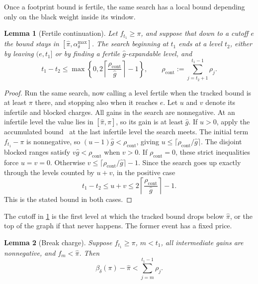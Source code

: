 \documentclass[11pt]{article}
\theoremstyle{plain}
\newtheorem{lemma}{Lemma}
\theoremstyle{remark}
\newcommand{\ghat}{\widehat g}
\newcommand{\pihat}{\widehat{\pi}}
\newcommand{\spend}[2]{\sum_{j=#1}^{#2}\rho_j}
\begin{document}
Once a footprint bound is fertile, the same search has a local bound depending only
on the black weight inside its window.

\begin{lemma}[Fertile continuation]
\label{lem:fertile-continuation}
Let \(f_{t_1}\ge\pi\), and suppose that down to a cutoff \(e\) the bound stays in
\([\pihat,\alpha_\delta^{\max}]\).  The search beginning at \(t_1\) ends at a
level \(t_2\), either by leaving \((e,t_1]\) or by finding a fertile
\(\ghat\)-expandable level, and
\begin{equation}
 t_1-t_2\le
 \max\left\{0,
 2\left\lceil\frac{\rho_{\mathrm{cont}}}{\ghat}\right\rceil-1\right\},
 \qquad \rho_{\mathrm{cont}}:=\spend{t_2+1}{t_1-1}.
 \label{eq:continuation-window}
\end{equation}
\end{lemma}

\begin{proof}
Run the same search, now calling a level fertile when the tracked bound is at least
\(\pi\) there, and stopping also when it reaches \(e\).  Let \(u\) and \(v\) denote its
infertile and blocked charges.  All gains in the search are nonnegative.  At an
infertile level the value lies in \([\pihat,\pi]\), so its gain is at least
\(\ghat\).  If \(u>0\), apply the accumulated
bound~\cite[Claim 3]{FOCS:Reyzin24} at the last infertile level the search meets.  The
initial term \(f_{t_1}-\pi\) is nonnegative, so
\((u-1)\ghat<\rho_{\mathrm{cont}}\), giving
\(u\le\lceil \rho_{\mathrm{cont}}/\ghat\rceil\).  The disjoint blocked ranges satisfy
\(v\ghat<\rho_{\mathrm{cont}}\) when \(v>0\).  If \(\rho_{\mathrm{cont}}=0\),
these strict inequalities force
\(u=v=0\).  Otherwise
\(v\le\lceil \rho_{\mathrm{cont}}/\ghat\rceil-1\).  Since the search goes up exactly through the
levels counted by \(u+v\), in the positive case
\[
 t_1-t_2\le u+v\le
 2\left\lceil\frac{\rho_{\mathrm{cont}}}{\ghat}\right\rceil-1.
\]
This is the stated bound in both cases.
\end{proof}

The cutoff in \cref{lem:fertile-continuation} is the first level at which the tracked
bound drops below \(\pihat\), or the top of the graph if that never happens.
The former event has a fixed price.

\begin{lemma}[Break charge]
\label{lem:break-charge}
Suppose \(f_{t_1}\ge\pi\), \(m<t_1\), all intermediate gains are nonnegative, and
\(f_m<\pihat\).  Then
\begin{equation}
 \beta_\delta(\pi)-\pihat
 <\spend{m}{t_1-1}.
 \label{eq:break-charge}
\end{equation}
\end{lemma}
\end{document}
